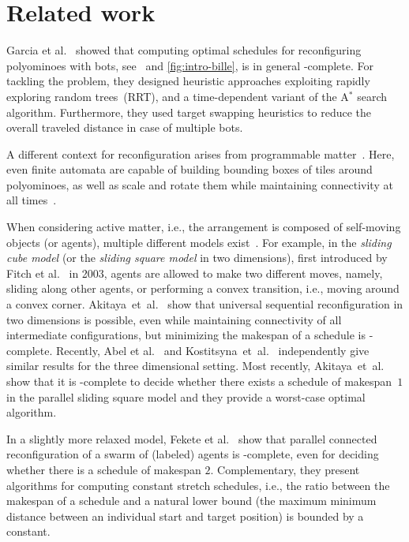 \section{Related work}
\label{subsec:related-work}

Garcia et al.~\cite{single-bille-reconfig-IROS,cooperative-bille-reconfig-ICRA} showed that computing optimal schedules for reconfiguring polyominoes with \BILLE bots, see~\cite{jenett2017bille} and \cref{fig:intro-bille}, is in general \NP-complete.
For tackling the problem, they designed heuristic approaches exploiting rapidly exploring random trees~(RRT), and a time-dependent variant of the A$^{*}$ search algorithm.
Furthermore, they used target swapping heuristics to reduce the overall traveled distance in case of multiple \BILLE bots.

A different context for reconfiguration arises from
programmable matter~\cite{gmyr2018recognition,gmyr2020forming,hinnenthal2024efficient}.
Here, even finite automata are capable of building bounding boxes of tiles
around polyominoes, as well as scale and rotate them while maintaining
connectivity at all times~\cite{fekete2022connected,NiesReconfig}.

When considering active matter, i.e., the arrangement is composed of self-moving objects (or agents), multiple different models exist~\cite{almethen2020pushing,almethen2022efficient,connor2025transformation,michail2019transformation}.
For example, in the \emph{sliding cube model} (or the \emph{sliding square model} in two dimensions), first introduced by Fitch et al.~\cite{FitchBR03,FitchBR05} in 2003, agents are allowed to make two different moves, namely, sliding along other agents, or performing a convex transition, i.e., moving around a convex corner.
Akitaya~et~al.~\cite{AkitayaDKKPSSUW22} show that universal sequential reconfiguration in two dimensions is possible, even while maintaining connectivity of all intermediate configurations, but minimizing the makespan of a schedule is \NP-complete.
Recently, Abel et al.~\cite{AbelAKKS24} and Kostitsyna~et~al.~\cite{KostitsynaOPPSS24} independently give similar results for the three dimensional setting.
Most recently, Akitaya~et~al.~\cite{parallel-sliding-squares} show that it is \NP-complete to decide whether there exists a schedule of makespan~$1$ in the parallel sliding square model and they provide a worst-case optimal algorithm.

In a slightly more relaxed model, Fekete et al.~\cite{FeketeKKRS23-journal-connected,FeketeKRS022-journal-labeled-connected} show that parallel connected reconfiguration of a swarm of (labeled) agents is \NP-complete, even for deciding whether there is a schedule of makespan $2$.
Complementary, they present algorithms for computing constant stretch schedules, i.e., the ratio between the makespan of a schedule and a natural lower bound (the maximum minimum distance between an individual start and target position) is bounded by a constant.